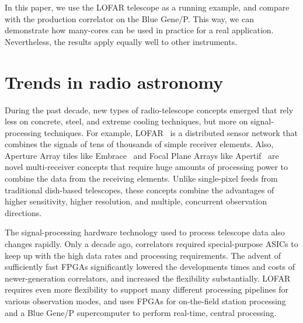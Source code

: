 \documentclass{article}
\begin{document}
In this paper, we use the LOFAR telescope as a running example, and
compare with the production correlator on the Blue Gene/P. This way,
we can demonstrate how many-cores can be used in practice for a real
application. Nevertheless, the results apply equally well to other
instruments.


\section{Trends in radio astronomy}





During the past decade, new types of radio-telescope concepts emerged that
rely less on concrete, steel, and extreme cooling techniques, but more on
signal-processing techniques.
For example, LOFAR~\cite{Butcher:04,deVos:09} is a distributed sensor network
that combines the signals of tens of thousands of simple receiver elements.
Also, Aperture Array tiles like Embrace~\cite{?} and Focal Plane Arrays
like Apertif~\cite{?} are novel multi-receiver concepts that require huge
amounts of processing power to combine the data from the receiving elements.
Unlike single-pixel feeds from traditional dish-based telescopes, these
concepts combine the advantages of higher sensitivity, higher resolution,
and multiple, concurrent observation directions.



The signal-processing hardware technology used to process telescope
data also changes rapidly.  Only a decade ago, correlators required
special-purpose ASICs to keep up with the high data rates and
processing requirements.  The advent of sufficiently fast FPGAs
significantly lowered the developments times and costs of
newer-generation correlators, and increased the flexibility
substantially.  LOFAR requires even more flexibility to support many
different processing pipelines for various observation modes, and uses
FPGAs for on-the-field station processing and a Blue Gene/P
supercomputer to perform real-time, central processing.
\end{document}
